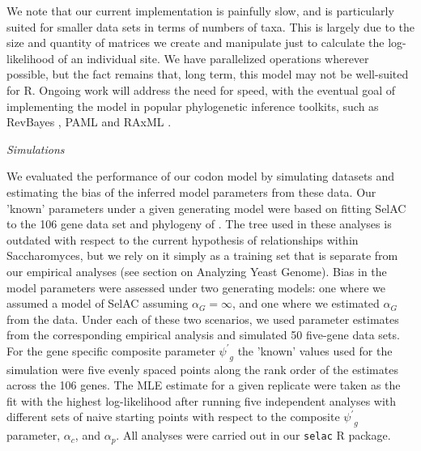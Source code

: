 \documentclass[12pt,letterpaper]{article}
\renewcommand{\subsection}[1]{%
\bigskip
\begin{center}
\begin{large}
\normalfont\itshape #1
\end{large}
\end{center}}
\newcommand{\alphac}{\ensuremath{\alpha_c}\xspace}
\newcommand{\alphag}{\ensuremath{\alpha_G}\xspace}
\newcommand{\alphap}{\ensuremath{\alpha_p}\xspace}
\newcommand{\psiprime}{\ensuremath{\psi^\prime}\xspace}
\begin{document}
We note that our current implementation is painfully slow, and is particularly suited for smaller data sets in terms of numbers of taxa.
This is largely due to the size and quantity of matrices we create and manipulate just to calculate the log-likelihood of an individual site.
We have parallelized operations wherever possible, but the fact remains that, long term, this model may not be well-suited for R.
Ongoing work will address the need for speed, with the eventual goal of implementing the model in popular phylogenetic inference toolkits, such as RevBayes \citep{revbayes}, PAML \citep{Yang2007} and RAxML \citep{Stamatakis2006}.

\subsection{Simulations}
We evaluated the performance of our codon model by simulating datasets and estimating the bias of the inferred model parameters from these data.
Our 'known' parameters under a given generating model were based on fitting SelAC to the 106 gene data set and phylogeny of \citet{RokasEtAl2003}.
The tree used in these analyses is outdated with respect to the current hypothesis of relationships within Saccharomyces, but we rely on it simply as a training set that is separate from our empirical analyses (see section on Analyzing Yeast Genome).
Bias in the model parameters were assessed under two generating models: one where we assumed a model of SelAC assuming $\alphag = \infty$, and one where we estimated $\alphag$ from the data.
Under each of these two scenarios, we used parameter estimates from the corresponding empirical analysis and simulated 50 five-gene data sets.
For the gene specific composite parameter $\psiprime_g$ the 'known' values used for the simulation were five evenly spaced points along the rank order of the estimates across the 106 genes.
The MLE estimate for a given replicate were taken as the fit with the highest log-likelihood after running five independent analyses with different sets of naive starting points with respect to the composite $\psiprime_g$ parameter, $\alphac$, and $\alphap$.
All analyses were carried out in our \texttt{selac} R package.
\end{document}
